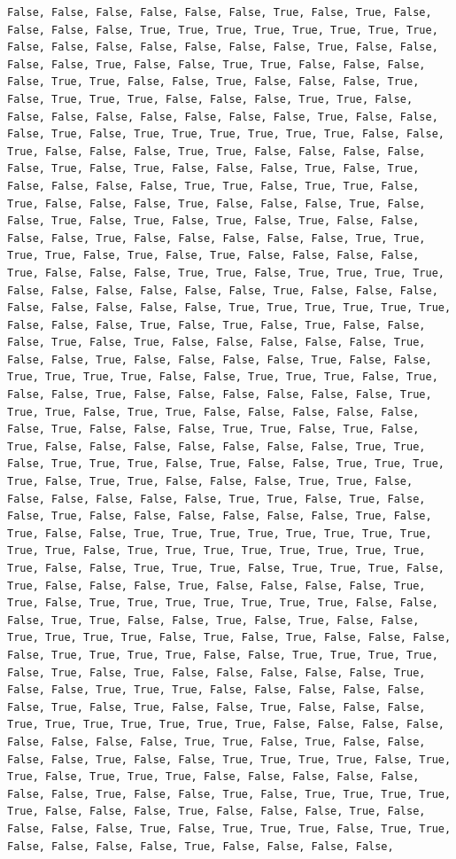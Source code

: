 \documentclass[
  letterpaper,
  DIV=11,
  numbers=noendperiod]{scrartcl}
\begin{document}
\begin{verbatim}
False, False, False, False, False, False, True, False, True, False, False, False, False, True, True, True, True, True, True, True, True, False, False, False, False, False, False, False, True, False, False, False, False, True, False, False, True, True, False, False, False, False, True, True, False, False, True, False, False, False, True, False, True, True, True, False, False, False, True, True, False, False, False, False, False, False, False, False, True, False, False, False, True, False, True, True, True, True, True, True, False, False, True, False, False, False, True, True, False, False, False, False, False, True, False, True, False, False, False, True, False, True, False, False, False, False, True, True, False, True, True, False, True, False, False, False, True, False, False, False, True, False, False, True, False, True, False, True, False, True, False, False, False, False, True, False, False, False, False, False, True, True, True, True, False, True, False, True, False, False, False, False, True, False, False, False, True, True, False, True, True, True, True, False, False, False, False, False, False, True, False, False, False, False, False, False, False, False, True, True, True, True, True, True, False, False, False, True, False, True, False, True, False, False, False, True, False, True, False, False, False, False, False, True, False, False, True, False, False, False, False, True, False, False, True, True, True, True, False, False, True, True, True, False, True, False, False, True, False, False, False, False, False, False, True, True, True, False, True, True, False, False, False, False, False, False, True, False, False, False, True, True, False, True, False, True, False, False, False, False, False, False, False, True, True, False, True, True, True, False, True, False, False, True, True, True, True, False, True, True, False, False, False, True, True, False, False, False, False, False, False, True, True, False, True, False, False, True, False, False, False, False, False, False, True, False, True, False, False, True, True, True, True, True, True, True, True, True, True, False, True, True, True, True, True, True, True, True, True, False, False, True, True, True, False, True, True, True, False, True, False, False, False, True, False, False, False, False, True, True, False, True, True, True, True, True, True, True, False, False, False, True, True, False, False, True, False, True, False, False, True, True, True, True, False, True, False, True, False, False, False, False, True, True, True, True, False, False, True, True, True, True, False, True, False, True, False, False, False, False, False, True, False, False, True, True, True, False, False, False, False, False, False, True, False, True, False, False, True, False, False, False, True, True, True, True, True, True, True, False, False, False, False, False, False, False, False, True, True, False, True, False, False, False, False, True, False, False, True, True, True, True, False, True, True, False, True, True, True, False, False, False, False, False, False, False, True, False, False, True, False, True, True, True, True, True, False, False, False, True, False, False, False, True, False, False, False, False, True, False, True, True, True, False, True, True, False, False, False, False, True, False, False, False, False, 
\end{verbatim}
\end{document}

